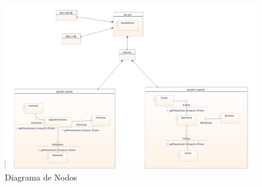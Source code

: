 \begin{figure}[h!]
	\centering
	\includegraphics[scale=0.5]{diseno/nodos/img/diagramaNodos}
	\caption{Diagrama de Nodos}
\end{figure}
